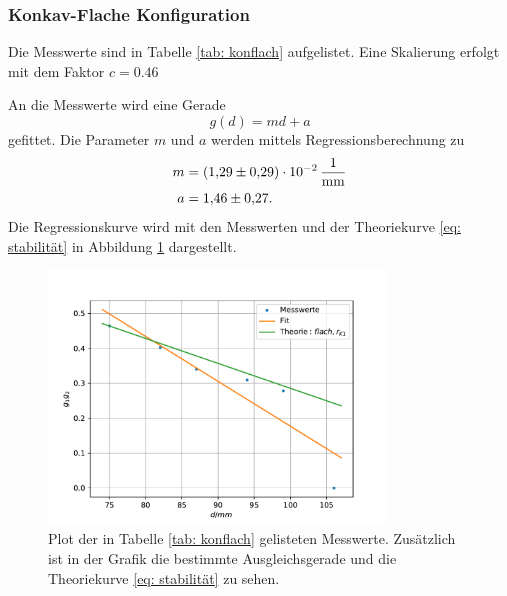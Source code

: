 \subsubsection{Konkav-Flache Konfiguration}
Die Messwerte sind in Tabelle \ref{tab: konflach} aufgelistet.
Eine Skalierung erfolgt mit dem Faktor $c=\num{0.46}$

An die Messwerte wird eine Gerade
\begin{equation*}
  g(d)=md+a
\end{equation*}
gefittet. Die Parameter $m$ und $a$ werden mittels Regressionsberechnung zu
\begin{align}
  \label{eq: konflach}
  \begin{aligned}
    m&=\SI{1.29 \pm 0.29 e-2}{\per\milli\meter}\\
    a&=\num{1.46\pm0.27}.
  \end{aligned}
\end{align}
Die Regressionskurve wird mit den Messwerten und der Theoriekurve \eqref{eq: stabilität} in Abbildung \ref{fig: konflach} dargestellt.

\begin{figure}[h!]
  \centering
  \includegraphics[width=0.8\textwidth]{../Messdaten/plots/konflach.pdf}
  \caption{Plot der in Tabelle \ref{tab: konflach} gelisteten Messwerte. Zusätzlich ist in der Grafik die bestimmte Ausgleichsgerade und die Theoriekurve \eqref{eq: stabilität} zu sehen.}
  \label{fig: konflach}
\end{figure}
\FloatBarrier
